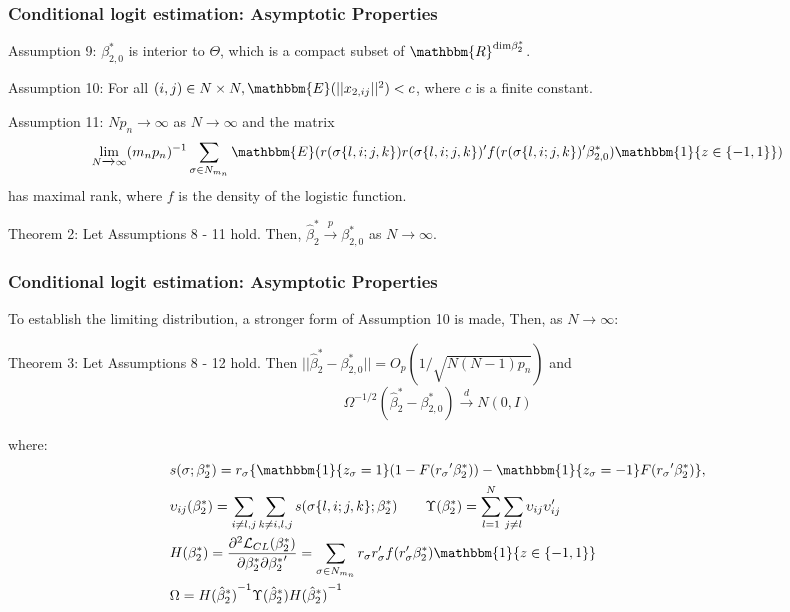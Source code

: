 \begin{frame}
    \frametitle{{Conditional logit estimation: Asymptotic Properties}}
    \begin{block}{Assumption 9:}
        $\beta_{2,0}^*$ is interior to $\Theta$, which is a compact subset of $\mathbbm{R}^{\text{dim} \beta_2^*}$.
    \end{block}
    
    \begin{block}{Assumption 10:}
        For all $(i,j) \in N \times N, \mathbbm{E}(\rvert \rvert x_{2,ij} \rvert \rvert^2) < c$, where $c$ is a finite constant.
    \end{block}
    
    \begin{block}{Assumption 11:}
        $Np_n \xrightarrow{} \infty$ as $N \xrightarrow{} \infty$ and the matrix
        $$ \lim_{N \xrightarrow{} \infty} (m_n p_n)^{-1} \sum_{\sigma \in N_{m_n}} \mathbbm{E} (r(\sigma\{l,i;j,k\}) r(\sigma\{l,i;j,k\})' f(r(\sigma\{l,i;j,k\})' \beta_{2,0}^*) \mathbbm{1}\{ z \in \{-1,1\}\}) $$
        has maximal rank, where $f$ is the density of the logistic function.
    \end{block} 

    \begin{block}{Theorem 2:}
        Let Assumptions 8 - 11 hold. Then, $\hat{\beta}_2^* \xrightarrow{p} \beta_{2,0}^*$ as $N \xrightarrow{} \infty$.
    \end{block}
\end{frame}

\begin{frame}
    \frametitle{{Conditional logit estimation: Asymptotic Properties}}
    To establish the limiting distribution, a stronger form of Assumption 10 is made, Then, as $N \xrightarrow{} \infty$:
    \begin{block}{Theorem 3:}
        Let Assumptions 8 - 12 hold. Then $\rvert \rvert \hat{\beta}_2^* - \beta_{2,0}^* \rvert \rvert = O_p (1/ \sqrt{N(N-1)p_n})$ and
        $$\Omega^{-1/2} (\hat{\beta}_2^* - \beta_{2,0}^*) \xrightarrow[]{d} N(0,I)$$
    \end{block}
    where:
    \begin{align*}
        &s(\sigma; \beta_2^*) = r_\sigma \{ \mathbbm{1} \{ z_\sigma = 1\} (1 - F({r_\sigma}' \beta_2^*)) - \mathbbm{1} \{ z_\sigma = - 1\}  F({r_\sigma}' \beta_2^*)\}, \\
    &\upsilon_{ij} (\beta_2^*) = \sum_{i \neq l,j} \sum_{k \neq i,l,j} s(\sigma\{l,i;j,k\}; \beta_2^*) \quad \quad \Upsilon (\beta_2^*) = \sum_{l=1}^N \sum_{j \neq l}  \upsilon_{ij} \upsilon_{ij}' \\
        &H (\beta_2^*) = \frac{\partial^2 \mathcal{L}_{CL}(\beta_2^*)}{\partial \beta_2^* \partial {\beta_2^*}'} = \sum_{\sigma \in N_{m_n}} r_\sigma r_\sigma' f(r_\sigma' \beta_2^*) \mathbbm{1}\{ z \in \{-1,1\}\} \\
        &\Omega = H {(\hat{\beta}_2^*)}^{-1} \Upsilon (\hat{\beta}_2^*) H {(\hat{\beta}_2^*)}^{-1}
\end{align*}
\end{frame}
